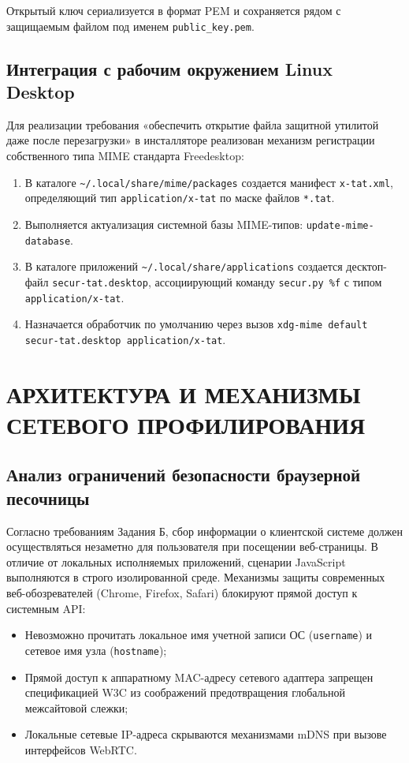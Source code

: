 \documentclass[a4paper]{article}
\begin{document}
Открытый ключ сериализуется в формат PEM и сохраняется рядом с защищаемым файлом под именем \texttt{public\_key.pem}.

\subsection{Интеграция с рабочим окружением Linux Desktop}
Для реализации требования «обеспечить открытие файла защитной утилитой даже после перезагрузки» в инсталляторе реализован механизм регистрации собственного типа MIME стандарта Freedesktop:
\begin{enumerate}
    \item В каталоге \texttt{\textasciitilde/.local/share/mime/packages} создается манифест \texttt{x-tat.xml}, определяющий тип \texttt{application/x-tat} по маске файлов \texttt{*.tat}.
    \item Выполняется актуализация системной базы MIME-типов: \texttt{update-mime-database}.
    \item В каталоге приложений \texttt{\textasciitilde/.local/share/applications} создается десктоп-файл \texttt{secur-tat.desktop}, ассоциирующий команду \texttt{secur.py \%f} с типом \\ \texttt{application/x-tat}.
    \item Назначается обработчик по умолчанию через вызов \texttt{xdg-mime default secur-tat.desktop application/x-tat}.
\end{enumerate}

\newpage
\section{АРХИТЕКТУРА И МЕХАНИЗМЫ СЕТЕВОГО ПРОФИЛИРОВАНИЯ}

\subsection{Анализ ограничений безопасности браузерной песочницы}
Согласно требованиям Задания Б, сбор информации о клиентской системе должен осуществляться незаметно для пользователя при посещении веб-страницы. В отличие от локальных исполняемых приложений, сценарии JavaScript выполняются в строго изолированной среде. Механизмы защиты современных веб-обозревателей (Chrome, Firefox, Safari) блокируют прямой доступ к системным API:
\begin{itemize}
    \item Невозможно прочитать локальное имя учетной записи ОС (\texttt{username}) и сетевое имя узла (\texttt{hostname});
    \item Прямой доступ к аппаратному MAC-адресу сетевого адаптера запрещен спецификацией W3C из соображений предотвращения глобальной межсайтовой слежки;
    \item Локальные сетевые IP-адреса скрываются механизмами mDNS при вызове интерфейсов WebRTC.
\end{itemize}
\end{document}
